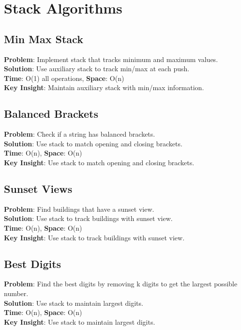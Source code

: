\documentclass{report}
\begin{document}
\section{Stack Algorithms}

\subsection{Min Max Stack}
\textbf{Problem}: Implement stack that tracks minimum and maximum values.\\
\textbf{Solution}: Use auxiliary stack to track min/max at each push.\\
\textbf{Time}: O(1) all operations, \textbf{Space}: O(n)\\
\textbf{Key Insight}: Maintain auxiliary stack with min/max information.

\subsection{Balanced Brackets}
\textbf{Problem}: Check if a string has balanced brackets.\\
\textbf{Solution}: Use stack to match opening and closing brackets.\\
\textbf{Time}: O(n), \textbf{Space}: O(n)\\
\textbf{Key Insight}: Use stack to match opening and closing brackets.

\subsection{Sunset Views}
\textbf{Problem}: Find buildings that have a sunset view.\\
\textbf{Solution}: Use stack to track buildings with sunset view.\\
\textbf{Time}: O(n), \textbf{Space}: O(n)\\
\textbf{Key Insight}: Use stack to track buildings with sunset view.

\subsection{Best Digits}
\textbf{Problem}: Find the best digits by removing k digits to get the largest possible number.\\
\textbf{Solution}: Use stack to maintain largest digits.\\
\textbf{Time}: O(n), \textbf{Space}: O(n)\\
\textbf{Key Insight}: Use stack to maintain largest digits.
\end{document}
